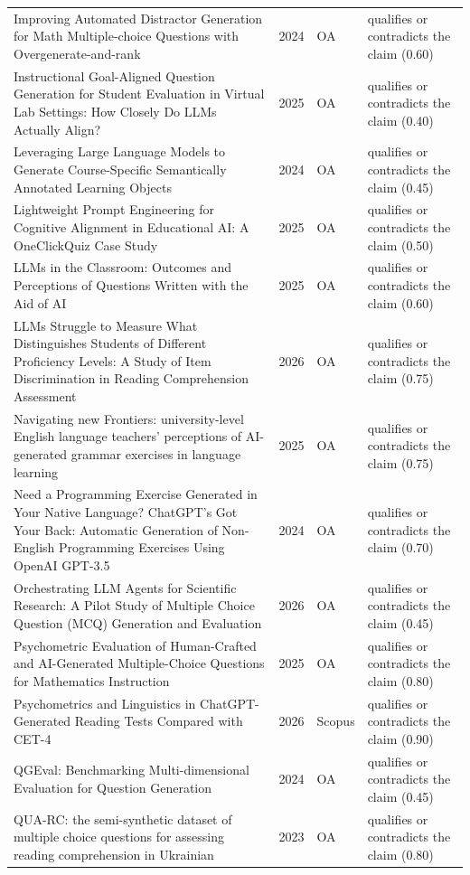 \begin{longtable}{@{}%
  >{\raggedright\arraybackslash}p{}c%
  >{\raggedright\arraybackslash}p{}%
  >{\raggedright\arraybackslash}p{}@{}}
Improving Automated Distractor Generation for Math Multiple-choice Questions with Overgenerate-and-rank & 2024 & OA & qualifies or contradicts the claim (0.60) \\
Instructional Goal-Aligned Question Generation for Student Evaluation in Virtual Lab Settings: How Closely Do LLMs Actually Align? & 2025 & OA & qualifies or contradicts the claim (0.40) \\
Leveraging Large Language Models to Generate Course-Specific Semantically Annotated Learning Objects & 2024 & OA & qualifies or contradicts the claim (0.45) \\
Lightweight Prompt Engineering for Cognitive Alignment in Educational AI: A OneClickQuiz Case Study & 2025 & OA & qualifies or contradicts the claim (0.50) \\
LLMs in the Classroom: Outcomes and Perceptions of Questions Written with the Aid of AI & 2025 & OA & qualifies or contradicts the claim (0.60) \\
LLMs Struggle to Measure What Distinguishes Students of Different Proficiency Levels: A Study of Item Discrimination in Reading Comprehension Assessment & 2026 & OA & qualifies or contradicts the claim (0.75) \\
Navigating new Frontiers: university-level English language teachers' perceptions of AI-generated grammar exercises in language learning & 2025 & OA & qualifies or contradicts the claim (0.75) \\
Need a Programming Exercise Generated in Your Native Language? ChatGPT's Got Your Back: Automatic Generation of Non-English Programming Exercises Using OpenAI GPT-3.5 & 2024 & OA & qualifies or contradicts the claim (0.70) \\
Orchestrating LLM Agents for Scientific Research: A Pilot Study of Multiple Choice Question (MCQ) Generation and Evaluation & 2026 & OA & qualifies or contradicts the claim (0.45) \\
Psychometric Evaluation of Human-Crafted and AI-Generated Multiple-Choice Questions for Mathematics Instruction & 2025 & OA & qualifies or contradicts the claim (0.80) \\
Psychometrics and Linguistics in ChatGPT-Generated Reading Tests Compared with CET-4 & 2026 & Scopus & qualifies or contradicts the claim (0.90) \\
QGEval: Benchmarking Multi-dimensional Evaluation for Question Generation & 2024 & OA & qualifies or contradicts the claim (0.45) \\
QUA-RC: the semi-synthetic dataset of multiple choice questions for assessing reading comprehension in Ukrainian & 2023 & OA & qualifies or contradicts the claim (0.80) \\

\end{longtable}
